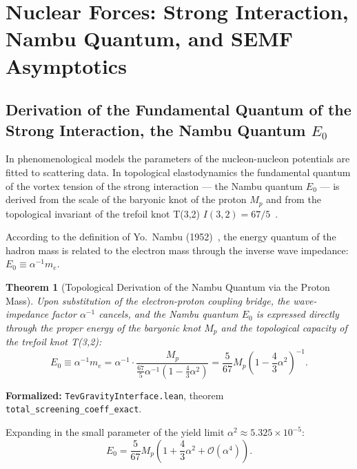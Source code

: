 \documentclass[11pt,a4paper]{article}
\newtheorem{theorem}{Theorem}
\theoremstyle{definition}
\theoremstyle{remark}
\begin{document}
\section{Nuclear Forces: Strong Interaction, Nambu Quantum, and SEMF Asymptotics}

\subsection{Derivation of the Fundamental Quantum of the Strong Interaction, the Nambu Quantum $E_0$}

In phenomenological models the parameters of the nucleon-nucleon potentials are fitted to scattering data. In topological elastodynamics the fundamental quantum of the vortex tension of the strong interaction — the Nambu quantum $E_0$ — is derived from the scale of the baryonic knot of the proton $M_p$ and from the topological invariant of the trefoil knot T(3,2) $I(3,2) = 67/5$~\cite{Nambu1973}.

According to the definition of Yo.~Nambu (1952)~\cite{Nambu1952}, the energy quantum of the hadron mass is related to the electron mass through the inverse wave impedance: $E_0 \equiv \alpha^{-1} m_e$.

\begin{theorem}[Topological Derivation of the Nambu Quantum via the Proton Mass]
\label{thm:nambu_quantum_derivation}
Upon substitution of the electron-proton coupling bridge, the wave-impedance factor $\alpha^{-1}$ cancels, and the Nambu quantum $E_0$ is expressed directly through the proper energy of the baryonic knot $M_p$ and the topological capacity of the trefoil knot T(3,2):
\begin{equation}
	E_0 \equiv \alpha^{-1} m_e = \alpha^{-1} \cdot \frac{M_p}{\frac{67}{5} \alpha^{-1} \left( 1 - \frac{4}{3}\alpha^2 \right)} = \frac{5}{67} M_p \left( 1 - \frac{4}{3}\alpha^2 \right)^{-1}.
\label{eq:nambu_quantum_exact}
\end{equation}
\end{theorem}

\noindent\small\textbf{Formalized:} \texttt{TevGravityInterface.lean}, theorem \texttt{total_screening_coeff_exact}.

Expanding in the small parameter of the yield limit $\alpha^2 \approx 5.325 \times 10^{-5}$:
\begin{equation}
	E_0 = \frac{5}{67} M_p \left( 1 + \frac{4}{3}\alpha^2 + \mathcal{O}(\alpha^4) \right).
	\label{eq:nambu_quantum_series}
\end{equation}
\end{document}

